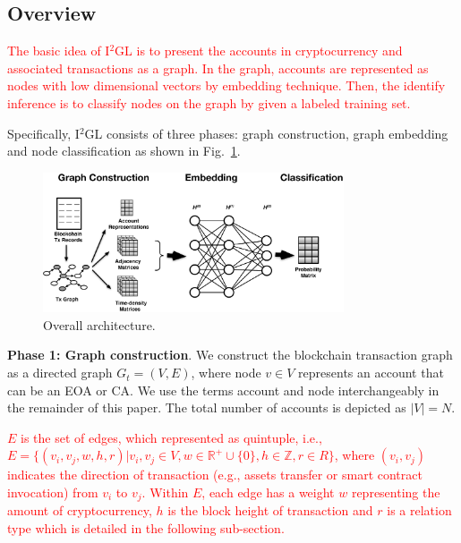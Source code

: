 \subsection{Overview}
\label{subsec:methodology}
\textcolor{red}{The basic idea of I$^2$GL is to present the accounts in cryptocurrency and associated transactions as a graph. In the graph, accounts are represented as nodes with low dimensional vectors by embedding technique. Then, the identify inference is to classify nodes on the graph by given a labeled training set.}

Specifically, I$^2$GL consists of three phases: graph construction, graph embedding and node classification as shown in Fig.~\ref{fig:architecture}.

\begin{figure}[htbp]
	\centering
	\includegraphics[width=3.5in]{fig/architecture.eps}
	\caption{Overall architecture.}
	\label{fig:architecture}
\end{figure}

\textbf{Phase 1: Graph construction}. We construct the blockchain transaction graph as a directed graph $G_{t}=(V,E)$, where node $v \in V$ represents an account that can be an EOA or CA. We use the terms account and node interchangeably in the remainder of this paper. The total number of accounts is depicted as $|V|=N$.

\textcolor{red}{$E$ is the set of edges, which represented as quintuple, i.e., $E=\{(v_i,v_j,w,h,r)|v_i,v_j \in V, w\in \mathbb{R}^+ \cup\{0\}, h\in \mathbb{Z}, r\in R\}$, where $(v_{i},v_{j})$ indicates the direction of transaction (e.g., assets transfer or smart contract invocation) from $v_i$ to $v_j$. Within $E$, each edge has a weight $w$ representing the amount of cryptocurrency, $h$ is the block height of transaction and $r$ is a relation type which is detailed in the following sub-section.}


